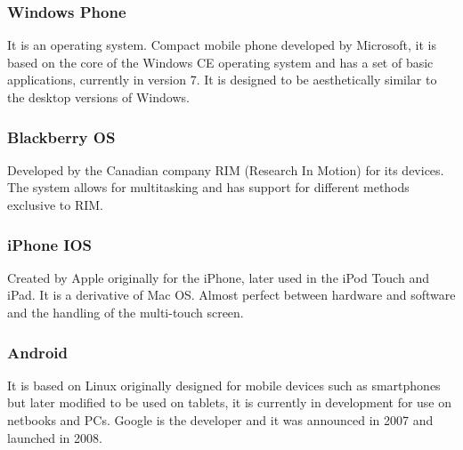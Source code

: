 \documentclass[conference]{IEEEtran}
\begin{document}
\subsubsection{Windows Phone}
It is an operating system. Compact mobile phone developed by Microsoft, it is based on the core of the Windows CE operating system and has a set of basic applications, currently in version 7.
It is designed to be aesthetically similar to the desktop versions of Windows.

\subsubsection{Blackberry OS}
Developed by the Canadian company RIM (Research In Motion) for its devices. The system allows for multitasking and has support for different methods exclusive to RIM.

\subsubsection{iPhone IOS}
Created by Apple originally for the iPhone, later used in the iPod Touch and iPad. It is a derivative of Mac OS. Almost perfect between hardware and software and the handling of the multi-touch screen.

\subsubsection{Android}
It is based on Linux originally designed for mobile devices such as smartphones but later modified to be used on tablets, it is currently in development for use on netbooks and PCs. Google is the developer and it was announced in 2007 and launched in 2008.
\end{document}
